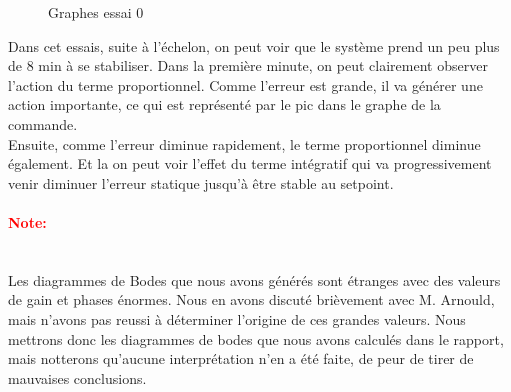 \begin{figure}[H]
    \centering
    \caption{Graphes essai 0}
    \label{fig:essai-0}
\end{figure}

Dans cet essais, suite à l'échelon, on peut voir que le système prend un peu 
plus de 8 min à se stabiliser. Dans la première minute, on peut clairement
observer l'action du terme proportionnel. Comme l'erreur est grande, 
il va générer une action importante, ce qui est représenté par le pic
dans le graphe de la commande.\\

Ensuite, comme l'erreur diminue rapidement, le terme proportionnel diminue également.
Et la on peut voir l'effet du terme intégratif qui va progressivement venir
diminuer l'erreur statique jusqu'à être stable au setpoint.

\paragraph{\textcolor{red}{Note:}}\mbox{}\\
Les diagrammes de Bodes que nous avons générés sont étranges avec des valeurs de gain et 
phases énormes. Nous en avons discuté brièvement avec M. Arnould, mais n'avons pas reussi à
déterminer l'origine de ces grandes valeurs. Nous mettrons donc les diagrammes de bodes que
nous avons calculés dans le rapport, mais notterons qu'aucune interprétation n'en a été faite,
de peur de tirer de mauvaises conclusions. 

